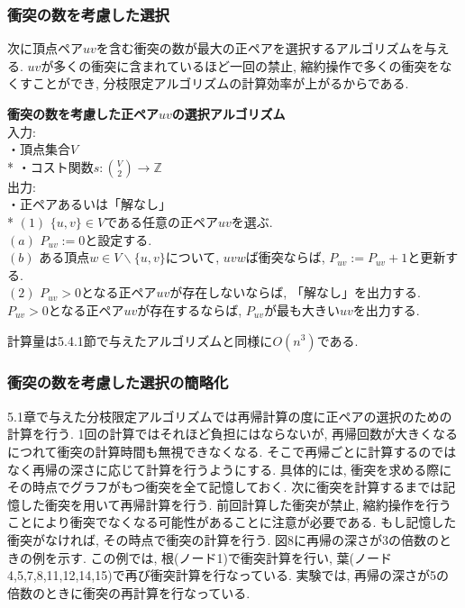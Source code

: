 \documentclass[10.5,a4paper,titlepage, dvipdfmx]{bxjsarticle}
\begin{document}
\subsubsection{衝突の数を考慮した選択}
次に頂点ペア$uv$を含む衝突の数が最大の正ペアを選択するアルゴリズムを与える.
$uv$が多くの衝突に含まれているほど一回の禁止, 縮約操作で多くの衝突をなくすことができ, 分枝限定アルゴリズムの計算効率が上がるからである.\par
\begin{screen}
    \textbf{衝突の数を考慮した正ペア$uv$の選択アルゴリズム}\\
    入力: \\
    \hspace{15pt} ・頂点集合$V$ \\*
    \hspace{15pt} ・コスト関数$s:\binom{V}{2} \rightarrow \mathbb{Z}$ \\
    出力: \\
    \hspace{15pt} ・正ペアあるいは「解なし」\\*
    $(1)$ $\{u,v\} \in V$である任意の正ペア$uv$を選ぶ.\\
    \hspace{15pt} $(a)$ $P_{uv}:=0$と設定する.\\
    \hspace{15pt} $(b)$ ある頂点$w \in V \backslash \{u,v\}$について, $uvw$ば衝突ならば, $P_{uv}:=P_{uv}+1$と更新する.\\
    $(2)$ $P_{uv} > 0$となる正ペア$uv$が存在しないならば, 「解なし」を出力する.\\
    \hspace{15pt}$P_{uv} > 0$となる正ペア$uv$が存在するならば, $P_{uv}$が最も大きい$uv$を出力する.
\end{screen}
計算量は5.4.1節で与えたアルゴリズムと同様に$O(n^3)$である.

\subsubsection{衝突の数を考慮した選択の簡略化}
5.1章で与えた分枝限定アルゴリズムでは再帰計算の度に正ペアの選択のための計算を行う.
1回の計算ではそれほど負担にはならないが, 再帰回数が大きくなるにつれて衝突の計算時間も無視できなくなる.
そこで再帰ごとに計算するのではなく再帰の深さに応じて計算を行うようにする.
具体的には, 衝突を求める際にその時点でグラフがもつ衝突を全て記憶しておく.
次に衝突を計算するまでは記憶した衝突を用いて再帰計算を行う.
前回計算した衝突が禁止, 縮約操作を行うことにより衝突でなくなる可能性があることに注意が必要である.
もし記憶した衝突がなければ, その時点で衝突の計算を行う.
図8に再帰の深さが3の倍数のときの例を示す.
この例では, 根(ノード1)で衝突計算を行い, 葉(ノード4,5,7,8,11,12,14,15)で再び衝突計算を行なっている.
実験では, 再帰の深さが5の倍数のときに衝突の再計算を行なっている.
\end{document}
